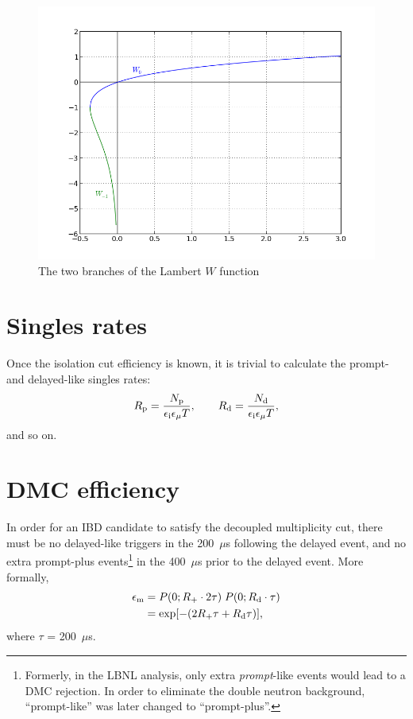 \documentclass[../thesis.tex]{subfiles}
\begin{document}
\begin{figure}
  \centering
  \includegraphics[scale=0.7]{../images/lambertW.png}
  \caption{The two branches of the Lambert $W$ function}
  \label{fig:lambertW}
\end{figure}

\section{Singles rates}
\label{sec:singratescalc}

Once the isolation cut efficiency is known, it is trivial to calculate the prompt- and delayed-like singles rates:
\begin{equation}
  R_\mathrm{p} = \frac{N_\mathrm{p}}{\epsilon_\mathrm{i} \epsilon_\mathrm{\mu} T},\qquad
  R_\mathrm{d} = \frac{N_\mathrm{d}}{\epsilon_\mathrm{i} \epsilon_\mathrm{\mu} T},
\end{equation}
and so on.

\section{DMC efficiency}
\label{sec:dmceffcalc}

\def\edmc{\ensuremath{\epsilon_\mathrm{m}}}

In order for an IBD candidate to satisfy the decoupled multiplicity cut, there must be no delayed-like triggers in the 200~$\mu$s following the delayed event, and no extra prompt-plus events\footnote{Formerly, in the LBNL analysis, only extra \emph{prompt}-like events would lead to a DMC rejection. In order to eliminate the double neutron background, ``prompt-like'' was later changed to ``prompt-plus''.} in the 400~$\mu$s prior to the delayed event. More formally,
\begin{align}
  \edmc &= P(0; \Rplu \cdot 2\tau)\;P(0; \Rdel \cdot \tau) \nonumber \\
        &= \exp [-(2\Rplu\tau + \Rdel\tau)],
\end{align}
where $\tau$ = 200~$\mu$s.
\end{document}
